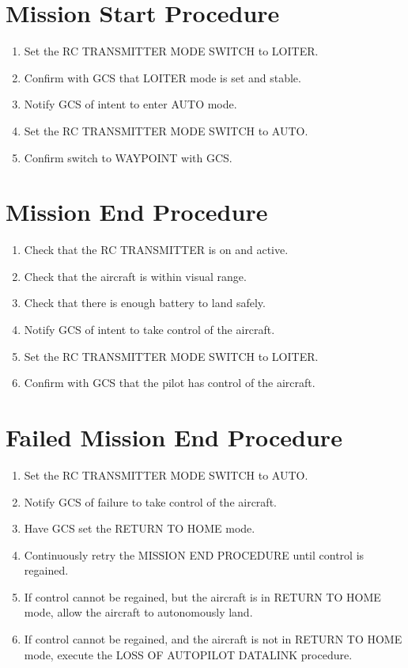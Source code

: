\documentclass{report}
\begin{document}
	\section{Mission Start Procedure}
		\begin{enumerate}
			\item Set the RC TRANSMITTER MODE SWITCH to LOITER.
			\item Confirm with GCS that LOITER mode is set and stable.
			\item Notify GCS of intent to enter AUTO mode.
			\item Set the RC TRANSMITTER MODE SWITCH to AUTO.
			\item Confirm switch to WAYPOINT with GCS.
		\end{enumerate}
	\section{Mission End Procedure}
		\begin{enumerate}
			\item Check that the RC TRANSMITTER is on and active.
			\item Check that the aircraft is within visual range.
			\item Check that there is enough battery to land safely.
			\item Notify GCS of intent to take control of the aircraft.
			\item Set the RC TRANSMITTER MODE SWITCH to LOITER.
			\item Confirm with GCS that the pilot has control of the aircraft.
		\end{enumerate}
	\section{Failed Mission End Procedure}
		\begin{enumerate}
			\item Set the RC TRANSMITTER MODE SWITCH to AUTO.
			\item Notify GCS of failure to take control of the aircraft.
			\item Have GCS set the RETURN TO HOME mode.
			\item Continuously retry the MISSION END PROCEDURE until control is regained.
			\item If control cannot be regained, but the aircraft is in RETURN TO HOME mode, allow the aircraft to autonomously land.
			\item If control cannot be regained, and the aircraft is not in RETURN TO HOME mode, execute the LOSS OF AUTOPILOT DATALINK procedure.
		\end{enumerate}
\end{document}
